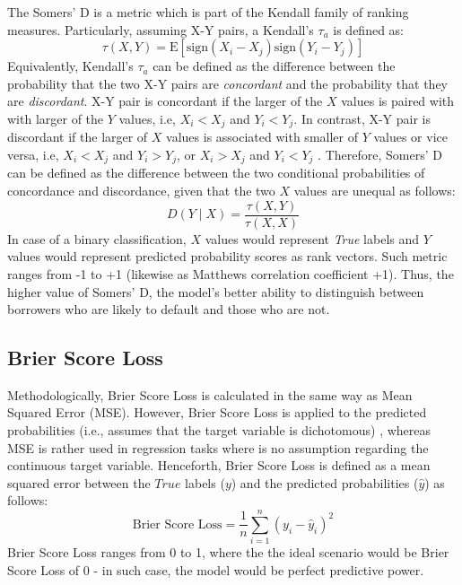 The Somers' D is a metric which is part of the Kendall family of ranking measures. Particularly, assuming X-Y pairs, a Kendall's $\tau_{a}$ is defined as:
\begin{equation}\label{eq}
    \tau\left(X,Y\right) = \text{E} \left[ \text{sign}(X_i - X_j) \text{sign} (Y_i - Y_j) \right]
\end{equation}
Equivalently, Kendall's $\tau_{a}$ can be defined as the difference between the probability that the two X-Y pairs are \textit{concordant} and the probability that they are \textit{discordant}. X-Y pair is concordant if the larger of the $X$ values is paired with with larger of the $Y$ values, i.e, $X_i < X_j$ and $Y_i < Y_j$.
In contrast, X-Y pair is discordant if the larger of $X$ values is associated with smaller of $Y$ values or vice versa, i.e, $X_i < X_j$ and $Y_i > Y_j$, or $X_i > X_j$ and $Y_i < Y_j$ \citep{newson2002parameters}.
Therefore, Somers' D can be defined as the difference between the two conditional probabilities of concordance and discordance, given that the two $X$ values are unequal \citep{newson2014interpretation} as follows:
\begin{equation}
    D\left(Y \mid X\right) = \frac{\tau\left(X,Y\right)}{\tau\left(X,X\right)}
\end{equation}
In case of a binary classification, $X$ values would represent \textit{True} labels and $Y$ values would represent predicted probability scores as rank vectors. Such metric ranges from -1 to +1 (likewise as Matthews correlation coefficient +1). Thus, the higher value of Somers' D, the model's better ability to distinguish between borrowers who are likely to default and those who are not.

\subsection{Brier Score Loss}
Methodologically, Brier Score Loss is calculated in the same way as Mean Squared Error (MSE). However, Brier Score Loss is applied to the predicted probabilities (i.e., assumes that the target variable is dichotomous) \citep{comotto2022evaluation}, whereas MSE is rather used in regression tasks where is no assumption regarding the continuous target variable.
Henceforth, Brier Score Loss is defined as a mean squared error between the $True$ labels ($y$) and the predicted probabilities ($\hat{y}$) as follows:
\begin{equation}\label{eq}
    \text{Brier Score Loss} = \frac{1}{n} \sum_{i=1}^{n} (y_i - \hat{y}_i)^2
\end{equation}
Brier Score Loss ranges from 0 to 1, where the the ideal scenario would be Brier Score Loss of 0 - in such case, the model would be perfect predictive power.
